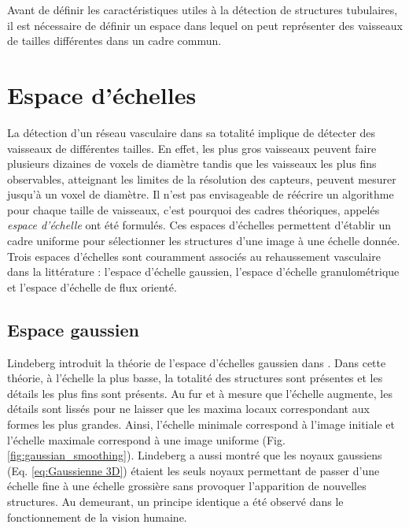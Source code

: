   Avant de définir les caractéristiques utiles à la détection de structures tubulaires, il est nécessaire de définir un espace dans lequel on peut représenter des vaisseaux de tailles différentes dans un cadre commun.

  \section{Espace d'échelles}
  \label{sec:EA:rehaussement:echelle}
  
  La détection d'un réseau vasculaire dans sa totalité implique de détecter des vaisseaux de différentes tailles. En effet, les plus gros vaisseaux peuvent faire plusieurs dizaines de voxels de diamètre tandis que les vaisseaux les plus fins observables, atteignant les limites de la résolution des capteurs, peuvent  mesurer jusqu'à un voxel de diamètre. Il n'est pas envisageable de réécrire un algorithme pour chaque taille de vaisseaux, c'est pourquoi des cadres théoriques, appelés \emph{espace d'échelle} ont été formulés. Ces espaces d'échelles permettent d'établir un cadre uniforme pour sélectionner les structures d'une image à une échelle donnée. Trois espaces d'échelles sont couramment associés au rehaussement vasculaire dans la littérature : l'espace d'échelle gaussien, l'espace d'échelle granulométrique et l'espace d'échelle de flux orienté.
  
  \subsection{Espace gaussien}
  \label{sec:EA:rehaussement:echelle:gaussien}
  Lindeberg introduit la théorie de l'espace d'échelles gaussien dans \cite{Lindeberg1994_scale}. Dans cette théorie, à l'échelle la plus basse, la totalité des structures sont présentes et les détails les plus fins sont présents. Au fur et à mesure que l'échelle augmente, les détails sont lissés pour ne laisser que les maxima locaux correspondant aux formes les plus grandes. Ainsi, l'échelle minimale correspond à l'image initiale et l'échelle maximale correspond à une image uniforme (Fig. \ref{fig:gaussian_smoothing}). Lindeberg a aussi montré que les noyaux gaussiens (Eq. \ref{eq:Gaussienne 3D}) étaient les seuls noyaux permettant de passer d'une échelle fine à une échelle grossière sans provoquer l'apparition de nouvelles structures. Au demeurant, un principe identique a été observé dans le fonctionnement de la vision humaine.
  
